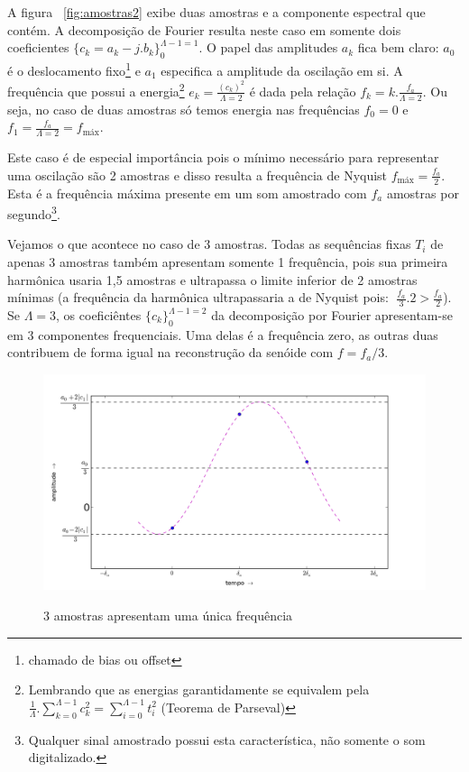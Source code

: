 A figura ~\ref{fig:amostras2} exibe duas amostras e a componente espectral que contém. A decomposição de Fourier resulta neste caso em somente dois coeficientes $\{c_k=a_k-j.b_k\}_0^{\Lambda-1=1}$. O papel das amplitudes $a_k$ fica bem claro:
 $a_0$ é o deslocamento fixo\footnote{chamado de bias ou offset} e $a_1$ especifica a amplitude da oscilação em si. A frequência que possui a energia\footnote{Lembrando que as energias garantidamente se equivalem pela $\frac{1}{\Lambda} . \sum_{k=0}^{\Lambda -1}c_k^2 = \sum_{i=0}^{\Lambda-1}t_i^2$ (Teorema de Parseval)}
 $e_k=\frac{(c_k)^2}{\Lambda=2}$ é dada pela relação $f_k=k . \frac{f_a}{\Lambda=2} $.  Ou seja, no caso de duas amostras só temos energia nas frequências $f_0=0$ e $f_1=\frac{f_a}{\Lambda=2}=f_{\text{máx}}$.

Este caso é de especial importância pois o mínimo necessário para representar uma oscilação são 2 amostras e disso resulta a frequência de Nyquist $f_{\text{máx}}=\frac{f_a}{2}$. Esta é a frequência máxima presente em um som amostrado com $f_a$ amostras por segundo\footnote{Qualquer sinal amostrado possui esta característica, não somente o som digitalizado.}.

Vejamos o que acontece no caso de 3 amostras. Todas as sequências fixas $T_i$ de apenas 3 amostras também apresentam
somente 1 frequência, pois sua primeira harmônica usaria 1,5 amostras e ultrapassa o limite inferior de 2 amostras mínimas (a frequência da harmônica ultrapassaria a de Nyquist pois:  $\; \frac{f_a}{3}.2 > \frac{f_a}{2} $). Se $\Lambda=3$, 
os coeficiêntes $\{c_k\}_0^{\Lambda-1=2}$ da decomposição por Fourier apresentam-se em 
3 componentes frequenciais. Uma delas é a frequência zero, as outras duas contribuem de forma igual na reconstrução da senóide com $f=f_a/3$.

\begin{figure}[h!]
    \centering
    \caption{3 amostras apresentam uma única frequência}
        \includegraphics[width=\textwidth]{figuras/amostras3b}
        \label{fig:amostras3}
\end{figure}



